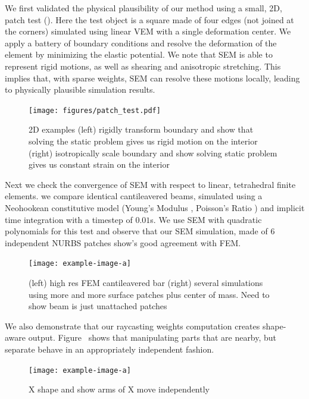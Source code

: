 

We first validated the physical plausibility of our method using a small, 2D, patch test (). 
Here the test object is a square made of four edges (not joined at the corners) simulated using linear VEM with a single deformation center.
We apply a battery of boundary conditions and resolve the deformation of the element by minimizing the elastic potential.
We note that SEM is able to represent rigid motions, as well as shearing and anisotropic stretching. 
This implies that, with sparse weights, SEM can resolve these motions locally, leading to physically plausible simulation results.

\begin{figure}
  \texttt{[image: figures/patch\_test.pdf]}
  \caption{2D examples (left) rigidly transform boundary and show that solving the static problem gives us rigid motion on the interior (right) isotropically scale boundary and show solving static problem gives us constant strain on the interior}
  \label{fig:patchtest}
\end{figure}

Next we check the convergence of SEM with respect to linear, tetrahedral finite elements.  we compare identical cantileavered beams, simulated using 
a Neohookean constitutive model (Young's Modulus , Poisson's Ratio ) and implicit time integration with a timestep of $0.01$s. 
We use SEM with quadratic polynomials for this test and observe that our SEM simulation, made of 6 independent NURBS patches show's good agreement with FEM.
\begin{figure}
  \texttt{[image: example-image-a]}
  \caption{(left) high res FEM cantileavered bar (right) several simulations using more and more surface patches plus center of mass. Need to show beam is just  unattached patches}
  \label{fig:convergence}
\end{figure}

We also demonstrate that our raycasting weights computation creates shape-aware output. Figure~ shows that manipulating
parts that are nearby, but separate  behave in an appropriately independent fashion. 
\begin{figure}
  \texttt{[image: example-image-a]}
  \caption{X shape and show arms of X move independently}
  \label{fig:independence}
\end{figure}

